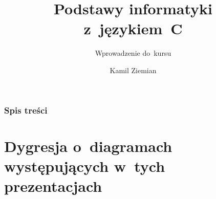 \documentclass[10pt,t]{beamer}
\title{Podstawy informatyki z~językiem~C}
\subtitle{Wprowadzenie do~kursu}
\author{Kamil Ziemian}
\begin{document}





\RaggedRight





\maketitle





\begin{frame}
  \frametitle{Spis treści}


  \tableofcontents

\end{frame}





\section{Dygresja o~diagramach występujących w~tych
  prezentacjach}
\end{document}
